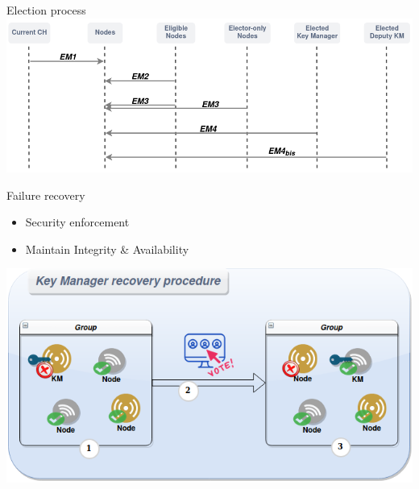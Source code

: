 \documentclass{beamer}
\begin{document}
\begin{frame}{Election process}
	\centering
	\includegraphics[width=\linewidth]{figures/election_exchange2.png}
\end{frame}

\begin{frame}{Failure recovery}
	\begin{itemize}
		\item Security enforcement
		\item Maintain Integrity \& Availability
	\end{itemize}
	\vfill
	\centering
	\includegraphics[scale=0.35]{figures/recovery.png}
\end{frame}
\end{document}
